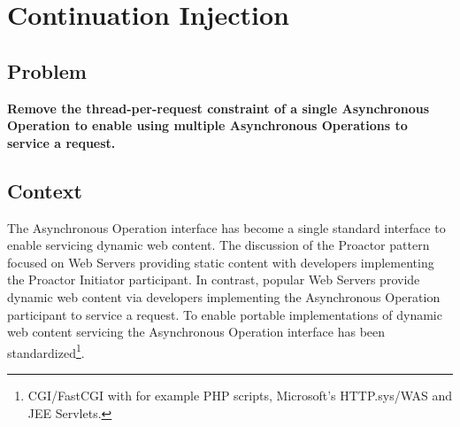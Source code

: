 \documentclass[prodmode]{style/acmlarge}
\begin{document}
\begin{table}[t]
\label{tab:example_request_operations}
\end{table}



\section{Continuation Injection}


\subsection{Problem}

\textbf{Remove the thread-per-request constraint of a single Asynchronous Operation to enable using multiple Asynchronous Operations to service a request.}


\subsection{Context}

The Asynchronous Operation interface has become a single standard interface to
enable servicing dynamic web content.  The discussion of the Proactor pattern
focused on Web Servers providing static content with developers implementing the
Proactor Initiator participant.  In contrast, popular Web Servers provide
dynamic web content via developers implementing the Asynchronous Operation
participant to service a request.  To enable portable implementations of dynamic
web content servicing the Asynchronous Operation interface has been
standardized\footnote{CGI/FastCGI with for example PHP scripts, Microsoft's
HTTP.sys/WAS and JEE Servlets.}.
\end{document}
